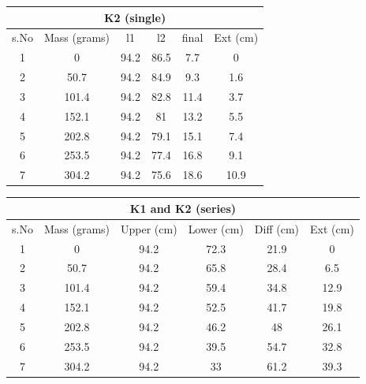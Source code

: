 \begin{center}
\begin{tabular}{|c|c|c|c|c|c|}
\hline
\multicolumn{6}{|c|}{\textbf{K2 (single)}}                  \\ \hline
s.No & Mass   (grams) & l1   & l2   & final & Ext      (cm) \\ \hline
1    & 0              & 94.2 & 86.5 & 7.7   & 0             \\ \hline
2    & 50.7           & 94.2 & 84.9 & 9.3   & 1.6           \\ \hline
3    & 101.4          & 94.2 & 82.8 & 11.4  & 3.7           \\ \hline
4    & 152.1          & 94.2 & 81   & 13.2  & 5.5           \\ \hline
5    & 202.8          & 94.2 & 79.1 & 15.1  & 7.4           \\ \hline
6    & 253.5          & 94.2 & 77.4 & 16.8  & 9.1           \\ \hline
7    & 304.2          & 94.2 & 75.6 & 18.6  & 10.9          \\ \hline
\end{tabular}
\end{center}

\begin{center}
    
\begin{tabular}{|c|c|c|c|c|c|}
\hline
\multicolumn{6}{|c|}{\textbf{K1 and K2 (series)}}                                   \\ \hline
s.No & Mass   (grams) & Upper   (cm) & Lower   (cm) & Diff     (cm) & Ext      (cm) \\ \hline
1    & 0              & 94.2         & 72.3         & 21.9          & 0             \\ \hline
2    & 50.7           & 94.2         & 65.8         & 28.4          & 6.5           \\ \hline
3    & 101.4          & 94.2         & 59.4         & 34.8          & 12.9          \\ \hline
4    & 152.1          & 94.2         & 52.5         & 41.7          & 19.8          \\ \hline
5    & 202.8          & 94.2         & 46.2         & 48            & 26.1          \\ \hline
6    & 253.5          & 94.2         & 39.5         & 54.7          & 32.8          \\ \hline
7    & 304.2          & 94.2         & 33           & 61.2          & 39.3          \\ \hline
\end{tabular}
\end{center}


